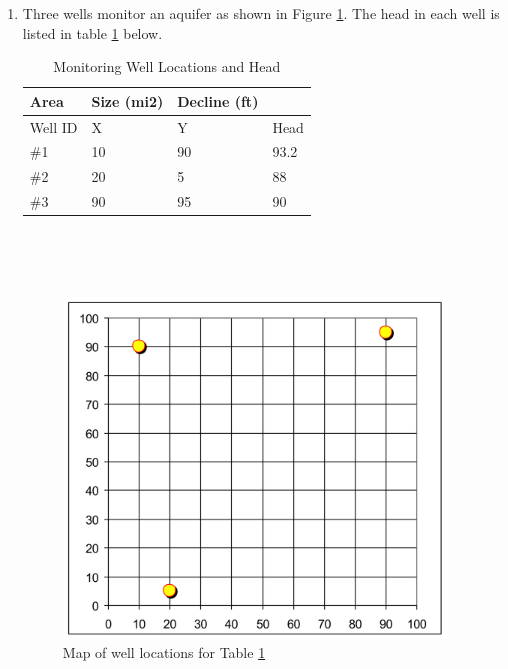 \documentclass[12pt]{article}
\begin{document}
\begin{enumerate}
\clearpage

\item Three wells monitor an aquifer as shown in Figure \ref{fig:3well}.  The head in each well is listed in table \ref{tab:3well} below.   %
\begin{table}[htbp]
\centering
  \caption{Monitoring Well Locations and Head}
\begin{tabular}{p{1in}p{1in}p{1in}p{1in}}
Area	& Size (mi2) & Decline (ft)\\
\hline
\hline
Well ID	&X	&Y	&Head\\
\#1	&10	&90	&93.2\\
\#2	&20	&5	&88\\
\#3	&90	&95	&90\\
\hline
\end{tabular}\\
\label{tab:3well}
\end{table}\\
\begin{figure}[htbp] %
   \centering
   \includegraphics[width=4in]{3well.jpg} 
   \caption{Map of well locations for Table \ref{tab:3well}}
   \label{fig:3well}
\end{figure}


\end{enumerate}
\end{document}
